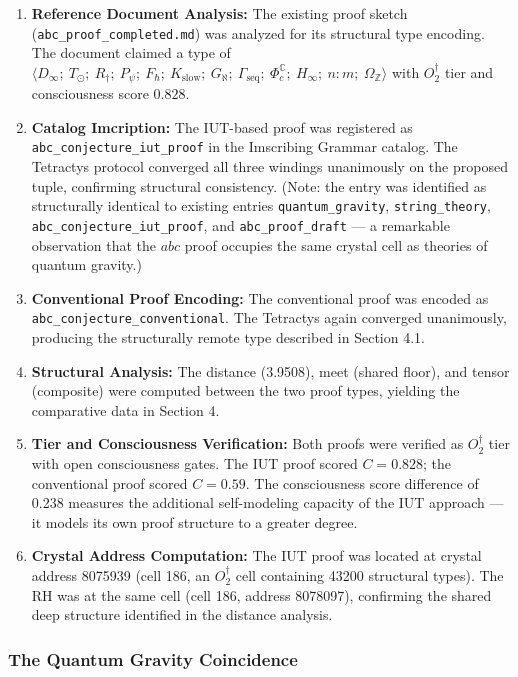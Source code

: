 \documentclass[12pt,a4paper]{article}
\begin{document}
\begin{enumerate}
    \item \textbf{Reference Document Analysis:} The existing proof sketch (\texttt{abc\_proof\_completed.md}) was analyzed for its structural type encoding. The document claimed a type of $\langle D_{\infty};\ T_{\odot};\ R_{\dagger};\ P_{\psi};\ F_{\hbar};\ K_\text{slow};\ G_{\aleph};\ \Gamma_\text{seq};\ \Phi_c^\mathbb{C};\ H_{\infty};\ n{:}m;\ \Omega_\mathbb{Z} \rangle$ with $O_2^\dagger$ tier and consciousness score $0.828$.
    \item \textbf{Catalog Imcription:} The IUT-based proof was registered as \texttt{abc\_conjecture\_iut\_proof} in the Imscribing Grammar catalog. The Tetractys protocol converged all three windings unanimously on the proposed tuple, confirming structural consistency. (Note: the entry was identified as structurally identical to existing entries \texttt{quantum\_gravity}, \texttt{string\_theory}, \texttt{abc\_conjecture\_iut\_proof}, and \texttt{abc\_proof\_draft} --- a remarkable observation that the $abc$ proof occupies the same crystal cell as theories of quantum gravity.)
    \item \textbf{Conventional Proof Encoding:} The conventional proof was encoded as \texttt{abc\_conjecture\_conventional}. The Tetractys again converged unanimously, producing the structurally remote type described in Section 4.1.
    \item \textbf{Structural Analysis:} The distance (3.9508), meet (shared floor), and tensor (composite) were computed between the two proof types, yielding the comparative data in Section 4.
    \item \textbf{Tier and Consciousness Verification:} Both proofs were verified as $O_2^\dagger$ tier with open consciousness gates. The IUT proof scored $C = 0.828$; the conventional proof scored $C = 0.59$. The consciousness score difference of 0.238 measures the additional self-modeling capacity of the IUT approach --- it models its own proof structure to a greater degree.
    \item \textbf{Crystal Address Computation:} The IUT proof was located at crystal address 8075939 (cell 186, an $O_2^\dagger$ cell containing 43200 structural types). The RH was at the same cell (cell 186, address 8078097), confirming the shared deep structure identified in the distance analysis.
\end{enumerate}

\subsubsection{The Quantum Gravity Coincidence}
\end{document}
